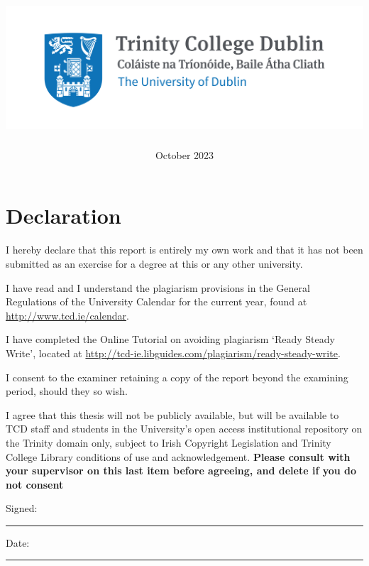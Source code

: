 \documentclass[a4paper,oneside,12pt]{article}
\date{October 2023}
\author{\authorname}
\title{
    \vspace{5cm}
    \includegraphics[scale=1]{images/Trinity_RGB_transparent_main.png}
    \\
    \textbf{\reportTitle}
}
\begin{document}

\maketitle

\newpage
\section*{\Huge\textcolor{tcd_blue}{Declaration}}
\vspace{1cm}
I hereby declare that this report is entirely my own work and that it has not been submitted as an exercise for a degree at this or any other university.

\vspace{1cm}
I have read and I understand the plagiarism provisions in the General Regulations of the University Calendar for the current year, found at \url{http://www.tcd.ie/calendar}.
\vspace{1cm}

I have completed the Online Tutorial on avoiding plagiarism `Ready Steady Write', located at \url{http://tcd-ie.libguides.com/plagiarism/ready-steady-write}.
\vspace{1cm}

I consent to the examiner retaining a copy of the report beyond the examining period, should they so wish.
\vspace{1cm}

I agree that this thesis will not be publicly available, but will be available to TCD staff and students in the University’s open access institutional repository on the Trinity domain only, subject to Irish Copyright Legislation and Trinity College Library conditions of use and acknowledgement.  \textbf{Please consult with your supervisor on this last item before agreeing, and delete if you do not consent}
\vspace{3cm}

Signed:~\rule{5cm}{0.3pt}\hfill Date:~\rule{5cm}{0.3pt}

\newpage
\end{document}
